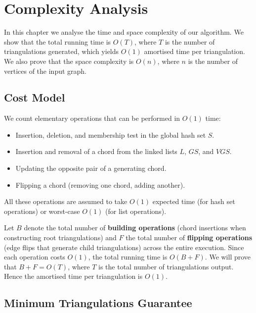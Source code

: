 
\chapter{Complexity Analysis}
\label{ch:complexity}

In this chapter we analyse the time and space complexity of our algorithm. 
We show that the total running time is \(O(T)\), where \(T\) is the number of triangulations generated, which yields \(O(1)\) amortised time per triangulation. 
We also prove that the space complexity is \(O(n)\), where \(n\) is the number of vertices of the input graph.

\section{Cost Model}
\label{sec:cost_model}

We count elementary operations that can be performed in \(O(1)\) time:
\begin{itemize}
    \item Insertion, deletion, and membership test in the global hash set \(S\).
    \item Insertion and removal of a chord from the linked lists \(L\), \(GS\), and \(VGS\).
    \item Updating the opposite pair of a generating chord.
    \item Flipping a chord (removing one chord, adding another).
\end{itemize}
All these operations are assumed to take \(O(1)\) expected time (for hash set operations) or worst-case \(O(1)\) (for list operations).

Let \(B\) denote the total number of \textbf{building operations} (chord insertions when constructing root triangulations) and \(F\) the total number of \textbf{flipping operations} (edge flips that generate child triangulations) across the entire execution. 
Since each operation costs \(O(1)\), the total running time is \(O(B + F)\). 
We will prove that \(B + F = O(T)\), where \(T\) is the total number of triangulations output. 
Hence the amortised time per triangulation is \(O(1)\).

\section{Minimum Triangulations Guarantee}
\label{sec:min_triangulations}

